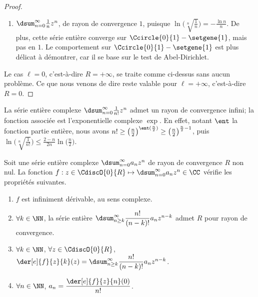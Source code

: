 \begin{proof}
\begin{itemize}
\begin{enumerate}[label=(\alph*)]
	        \item $\dsum_{n=0}^{\infty}  \frac{1}{n} z^n$, 
	        de rayon de convergence $1$,
	        puisque 
	        $ \ln \big( \sqrt[n]{\frac{1}{n}} \big)
	        = -\frac{\ln n}{n}$.
	        De plus,
	        cette série entière converge sur $\Ccircle{0}{1} - \setgene{1}$, mais pas en $1$. 
	        Le comportement sur $\Ccircle{0}{1} - \setgene{1}$ est plus délicat à démontrer, car il se base sur le test de Abel-Dirichlet.
	    \end{enumerate}
    \end{itemize}


    Le cas $\ell = 0$, c'est-à-dire $R = +\infty$, se traite comme ci-dessus sans aucun problème. 
    Ce que nous venons de dire reste valable pour $\ell = +\infty$, c'est-à-dire $R = 0$.
\end{proof}


\begin{example}
	La série entière complexe $\dsum_{n=0}^{\infty} \frac{1}{n!} z^n$ admet un rayon de convergence infini; la fonction associée est l'exponentielle complexe $\exp$.
	En effet,
	notant $\ent$ la fonction partie entière, nous avons
	$n! \geq \big( \frac{n}{2} \big)^{\ent (\frac{n}{2})} \geq \big( \frac{n}{2} \big)^{\frac{n}{2} - 1}$,
	puis
	$ \ln \big( \sqrt[n]{\frac{1}{n!}} \big)
	\leq
	  \frac{2 - n}{2 n} \ln \big( \frac{n}{2} \big)$.
\end{example}




\begin{preli} \label{XXX}
    Soit une série entière complexe $\dsum_{n=0}^{\infty} a_n z^n$ de rayon de convergence $R$ non nul.
    La fonction $f: z \in \CdiscO{0}{R} \mapsto \dsum_{n=0}^{\infty} a_n z^n \in \CC$ vérifie les propriétés suivantes.
    \begin{enumerate}
    	\item $f$ est infiniment dérivable, au sens complexe.

    	\item $\forall k \in \NN$,
		la série entière $\dsum_{n \geq k}^{\infty} \dfrac{n!}{(n-k)!} a_n z^{n - k}$ admet $R$ pour rayon de convergence.

    	\item $\forall k \in \NN$, $\forall z \in \CdiscO{0}{R}$,
		$\der[e]{f}{z}{k}(z) = \dsum_{n \geq k}^{\infty} \dfrac{n!}{(n-k)!} a_n z^{n - k}$.

    	\item \label{a_n-value}
		$\forall n \in \NN$,  $a_n = \dfrac{\der[e]{f}{z}{n}(0)}{n!}$.
    \end{enumerate}
\end{preli}


